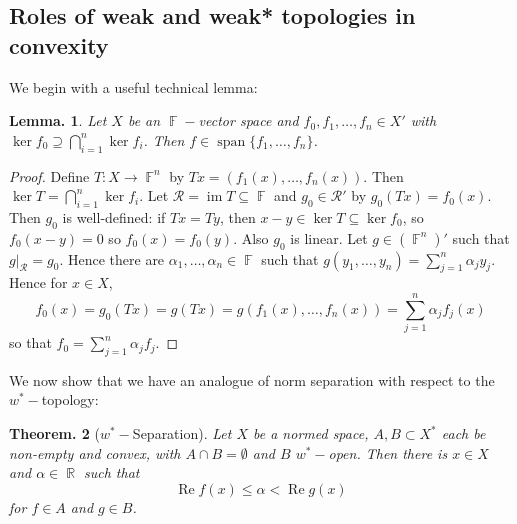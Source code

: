 \documentclass[11pt, a4paper]{memoir}
\DeclareMathOperator{\R}{{\mathbb{R}}}
\DeclareMathOperator{\F}{{\mathbb{F}}}
\theoremstyle{change}
\newtheorem{theorem}{Theorem.}[section]
\newtheorem{lemma}[theorem]{Lemma.}
\theoremstyle{plain}
\theoremstyle{nonumberplain}
\newtheorem{proof}{Proof}
\DeclareMathOperator{\im}{im}
\DeclareMathOperator{\spn}{span}
\renewcommand{\Re}{\ensuremath{\operatorname{Re}}}
\numberwithin{equation}{section}
\begin{document}
\subsection{Roles of weak and weak* topologies in convexity}
We begin with a useful technical lemma:
\begin{lemma}\label{l:ws-ker}
    Let $X$ be an $\F-$vector space and $f_0,f_1,\ldots,f_n\in X'$ with $\ker f_0\supseteq\bigcap_{i=1}^n\ker f_i$.
    Then $f\in\spn\{f_1,\ldots,f_n\}$.
\end{lemma}
\begin{proof}
    Define $T:X\to\F^n$ by $Tx=(f_1(x),\ldots,f_n(x))$.
    Then $\ker T=\bigcap_{i=1}^n\ker f_i$.
    Let $\mathcal{R}=\im T\subseteq\F$ and $g_0\in\mathcal{R}'$ by $g_0(Tx)=f_0(x)$.
    Then $g_0$ is well-defined: if $Tx=Ty$, then $x-y\in\ker T\subseteq\ker f_0$, so $f_0(x-y)=0$ so $f_0(x)=f_0(y)$.
    Also $g_0$ is linear.
    Let $g\in(\F^n)'$ such that $g|_{\mathcal{R}}=g_0$.
    Hence there are $\alpha_1,\ldots,\alpha_n\in\F$ such that $g(y_1,\ldots,y_n)=\sum_{j=1}^n\alpha_jy_j$.
    Hence for $x\in X$,
    \begin{equation*}
        f_0(x)=g_0(Tx)=g(Tx)=g(f_1(x),\ldots,f_n(x))=\sum_{j=1}^n\alpha_jf_j(x)
    \end{equation*}
    so that $f_0=\sum_{j=1}^n\alpha_jf_j$.
\end{proof}
We now show that we have an analogue of norm separation with respect to the $w^*-$topology:
\begin{theorem}[$w^*-$Separation]
    Let $X$ be a normed space, $A,B\subset X^*$ each be non-empty and convex, with $A\cap B=\emptyset$ and $B$ $w^*-$open.
    Then there is $x\in X$ and $\alpha\in\R$ such that
    \begin{equation*}
        \Re f(x)\leq \alpha < \Re g(x)
    \end{equation*}
    for $f\in A$ and $g\in B$.
\end{theorem}
\end{document}
